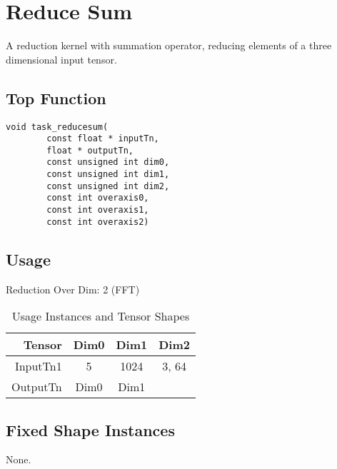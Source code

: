 \documentclass[•]{article}
\begin{document}
\pagebreak









\section{Reduce Sum}
A reduction kernel with summation operator, reducing elements of a three dimensional input tensor.
\subsection{Top Function}
\begin{lstlisting}
void task_reducesum(
        const float * inputTn,
        float * outputTn,
        const unsigned int dim0,
        const unsigned int dim1,
        const unsigned int dim2,
        const int overaxis0,
        const int overaxis1,
        const int overaxis2)
\end{lstlisting}

\subsection{Usage}
Reduction Over Dim: 2 (FFT)
\vspace{0.5cm}
\begin{table}[htbp] %
\caption{Usage Instances and Tensor Shapes}
\label{tab:shapes_concat}
	\begin{center}
		\begin{tabular}{|r|c|c|c|} 
		\hline	
		Tensor & Dim0 & Dim1 & Dim2\\ 
		\hline	
		InputTn1 &
			5 &
			1024 &
			3, 64 \\ 
		\hline
		OutputTn &
			Dim0 & 
			Dim1 & 
				\\
		\hline
		\end{tabular}
	\end{center}
\end{table}

\subsection{Fixed Shape Instances}
None.
\end{document}
